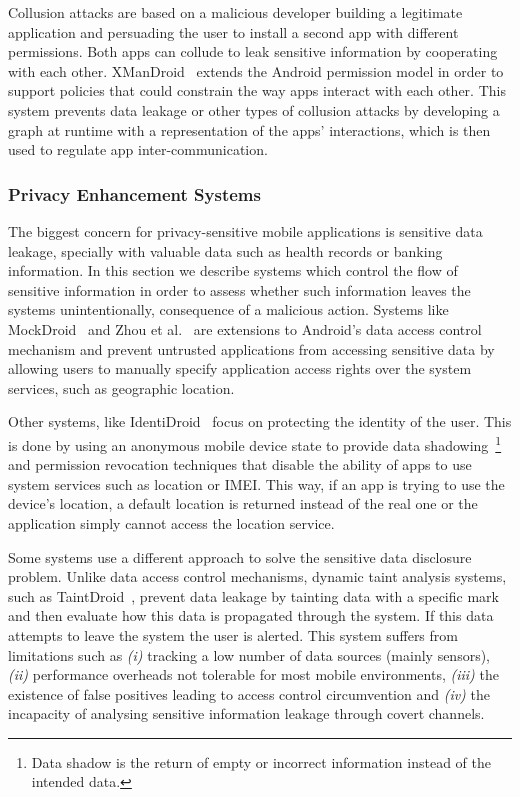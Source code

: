 Collusion attacks are based on a malicious developer building a legitimate application and persuading the user to install a second app with different permissions. Both apps can collude to leak sensitive information by cooperating with each other. XManDroid~\cite{bugiel2011xmandroid} extends the Android permission model in order to support policies that could constrain the way apps interact with each other. This system prevents data leakage or other types of collusion attacks by developing a graph at runtime with a representation of the apps’ interactions, which is then used to regulate app inter-communication.

\subsubsection{Privacy Enhancement Systems}

The biggest concern for privacy-sensitive mobile applications is sensitive data leakage, specially with valuable data such as health records or banking information. In this section we describe systems which control the flow of sensitive information in order to assess whether such information leaves the systems unintentionally, consequence of a malicious action. Systems like MockDroid~\cite{beresford2011mockdroid} and Zhou et al.~\cite{zhou2011taming} are extensions to Android's data access control mechanism and prevent untrusted applications from accessing sensitive data by allowing users to manually specify application access rights over the system services, such as geographic location.

Other systems, like IdentiDroid~\cite{shebaro2014identidroid} focus on protecting the identity of the user. This is done by using an anonymous mobile device state to provide data shadowing~\footnote{Data shadow is the return of empty or incorrect information instead of the intended data.} and permission revocation techniques that disable the ability of apps to use system services such as location or \ac{IMEI}. This way, if an app is trying to use the device's location, a default location is returned instead of the real one or the application simply cannot access the location service.

Some systems use a different approach to solve the sensitive data disclosure problem. Unlike data access control mechanisms, dynamic taint analysis systems, such as TaintDroid~\cite{enck2014taintdroid}, prevent data leakage by tainting data with a specific mark and then evaluate how this data is propagated through the system. If this data attempts to leave the system the user is alerted. This system suffers from limitations such as \emph{(i)} tracking a low number of data sources (mainly sensors), \emph{(ii)} performance overheads not tolerable for most mobile environments, \emph{(iii)} the existence of false positives leading to access control circumvention and \emph{(iv)} the incapacity of analysing sensitive information leakage through covert channels.


